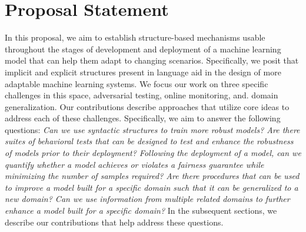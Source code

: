 


\section{Proposal Statement}
In this proposal, we aim to establish structure-based mechanisms usable throughout the stages of development and deployment of a machine learning model that can help them adapt to changing scenarios. 
Specifically, we posit that implicit and explicit structures present in language aid in the design of more adaptable machine learning systems.
We focus our work on three specific challenges in this space, adversarial testing, online monitoring, and. domain generalization.
Our contributions describe approaches that utilize core ideas to address each of these challenges.
Specifically, we aim to answer the following questions: 
\textit{Can we use syntactic structures to train more robust models?
Are there suites of behavioral tests that can be designed to test and enhance the robustness of models prior to their deployment?
Following the deployment of a model, can we quantify whether a model achieves or violates a fairness guarantee while minimizing the number of samples required?
Are there procedures that can be used to improve a model built for a specific domain such that it can be generalized to a new domain?
Can we use information from multiple related domains to further enhance a model built for a specific domain?}
In the subsequent sections, we describe our contributions that help address these questions.

